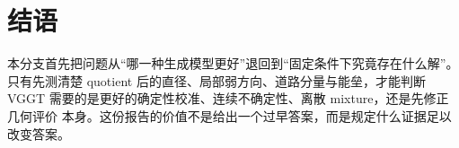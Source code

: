\documentclass[UTF8,a4paper,11pt]{ctexart}
\begin{document}
\section*{结语}

本分支首先把问题从“哪一种生成模型更好”退回到“固定条件下究竟存在什么解”。
只有先测清楚 quotient 后的直径、局部弱方向、道路分量与能垒，才能判断 VGGT
需要的是更好的确定性校准、连续不确定性、离散 mixture，还是先修正几何评价
本身。这份报告的价值不是给出一个过早答案，而是规定什么证据足以改变答案。



\end{document}
